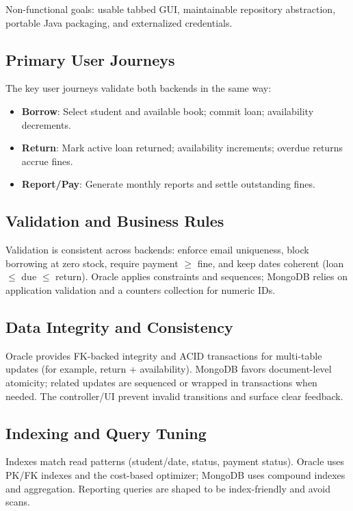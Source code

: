 \documentclass[12pt,a4paper]{article}
\begin{document}
Non-functional goals: usable tabbed GUI, maintainable repository abstraction, portable Java packaging, and externalized credentials.

\subsection{Primary User Journeys}

The key user journeys validate both backends in the same way:
\begin{itemize}
    \item \textbf{Borrow}: Select student and available book; commit loan; availability decrements.
    \item \textbf{Return}: Mark active loan returned; availability increments; overdue returns accrue fines.
    \item \textbf{Report/Pay}: Generate monthly reports and settle outstanding fines.
\end{itemize}

\subsection{Validation and Business Rules}

Validation is consistent across backends: enforce email uniqueness, block borrowing at zero stock, require payment \(\ge\) fine, and keep dates coherent (loan \(\le\) due \(\le\) return). Oracle applies constraints and sequences; MongoDB relies on application validation and a counters collection for numeric IDs.

\subsection{Data Integrity and Consistency}

Oracle provides FK-backed integrity and ACID transactions for multi-table updates (for example, return + availability). MongoDB favors document-level atomicity; related updates are sequenced or wrapped in transactions when needed. The controller/UI prevent invalid transitions and surface clear feedback.

\subsection{Indexing and Query Tuning}

Indexes match read patterns (student/date, status, payment status). Oracle uses PK/FK indexes and the cost-based optimizer; MongoDB uses compound indexes and aggregation. Reporting queries are shaped to be index-friendly and avoid scans.
\end{document}
